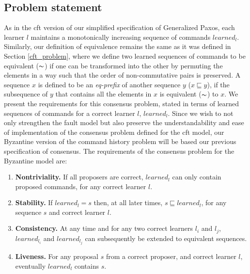 \subsection{Problem statement}
As in the \acrshort{cft} version of our simplified specification of Generalized Paxos, each learner $l$ maintains a monotonically increasing sequence of commands $learned_l$. Similarly, our definition of equivalence remains the same as it was defined in Section \ref{cft_problem}, where we define two learned sequences of commands to be equivalent ($\thicksim$) if one can be transformed into the other by permuting the elements in a way such that the order of non-commutative pairs is preserved. A sequence $x$ is defined to be an \textit{eq-prefix} of another sequence $y$ ($x \sqsubseteq y$), if the subsequence of $y$ that contains all the elements in $x$ is equivalent ($\thicksim$) to $x$. 
We present the requirements for this consensus problem, stated in terms of learned sequences of commands for a correct learner $l$, $learned_l$. Since we wish to not only strengthen the fault model but also preserve the understandability and ease of implementation of the consensus problem defined for the \acrshort{cft} model, our Byzantine version of the command history problem will be based our previous specification of consensus. The requirements of the consensus problem for the Byzantine model are:\par
%
\begin{enumerate}
	\item \textbf{Nontriviality.} If all proposers are correct, $learned_l$ can only contain proposed commands, for any correct learner $l$.
	\item \textbf{Stability.} If $learned_l = s$ then, at all later times, $s \sqsubseteq learned_l$, for any sequence $s$ and correct learner $l$.
	\item \textbf{Consistency.} At any time and for any two correct learners $l_i$ and $l_j$, $learned_{l_i}$ and $learned_{l_j}$ can subsequently be extended to equivalent sequences.
	\item \textbf{Liveness.} For any proposal $s$ from a correct proposer, and correct learner $l$, eventually $learned_l$ contains $s$.
\end{enumerate}

